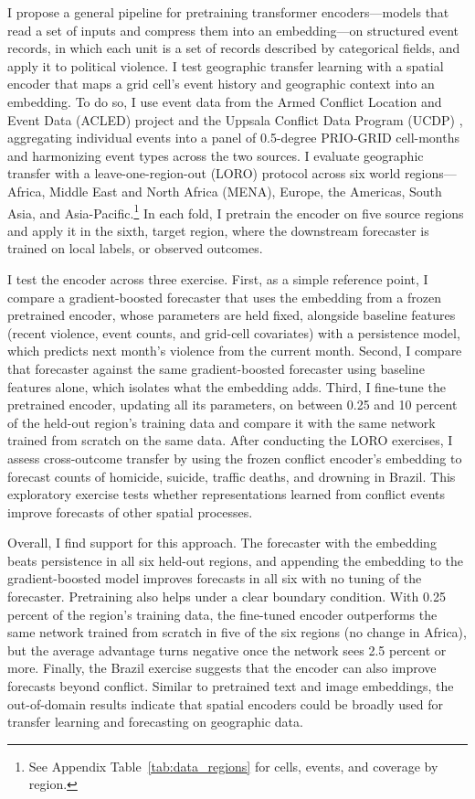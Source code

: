 \documentclass[11pt, letterpaper]{article}
\begin{document}
I propose a general pipeline for pretraining transformer encoders---models that read a set of inputs and compress them into an embedding---on structured event records, in which each unit is a set of records described by categorical fields, and apply it to political violence. I test geographic transfer learning with a spatial encoder that maps a grid cell's event history and geographic context into an embedding. To do so, I use event data from the Armed Conflict Location and Event Data (ACLED) project \citep{raleigh2010acled} and the Uppsala Conflict Data Program (UCDP) \citep{sundberg2013ucdp}, aggregating individual events into a panel of 0.5-degree PRIO-GRID cell-months and harmonizing event types across the two sources. I evaluate geographic transfer with a leave-one-region-out (LORO) protocol across six world regions---Africa, Middle East and North Africa (MENA), Europe, the Americas, South Asia, and Asia-Pacific.\footnote{See Appendix Table~\ref{tab:data_regions} for cells, events, and coverage by region.} In each fold, I pretrain the encoder on five source regions and apply it in the sixth, target region, where the downstream forecaster is trained on local labels, or observed outcomes.


I test the encoder across three exercise. First, as a simple reference point, I compare a gradient-boosted forecaster that uses the embedding from a frozen pretrained encoder, whose parameters are held fixed, alongside baseline features (recent violence, event counts, and grid-cell covariates) with a persistence model, which predicts next month's violence from the current month. Second, I compare that forecaster against the same gradient-boosted forecaster using baseline features alone, which isolates what the embedding adds. Third, I fine-tune the pretrained encoder, updating all its parameters, on between 0.25 and 10 percent of the held-out region's training data and compare it with the same network trained from scratch on the same data. After conducting the LORO exercises, I assess cross-outcome transfer by using the frozen conflict encoder's embedding to forecast counts of homicide, suicide, traffic deaths, and drowning in Brazil. This exploratory exercise tests whether representations learned from conflict events improve forecasts of other spatial processes. 

Overall, I find support for this approach. The forecaster with the embedding beats persistence in all six held-out regions, and appending the embedding to the gradient-boosted model improves forecasts in all six with no tuning of the forecaster. Pretraining also helps under a clear boundary condition. With 0.25 percent of the region's training data, the fine-tuned encoder outperforms the same network trained from scratch in five of the six regions (no change in Africa), but the average advantage turns negative once the network sees 2.5 percent or more. Finally, the Brazil exercise suggests that the encoder can also improve forecasts beyond conflict. Similar to pretrained text and image embeddings, the out-of-domain results indicate that spatial encoders could be broadly used for transfer learning and forecasting on geographic data.
\end{document}
